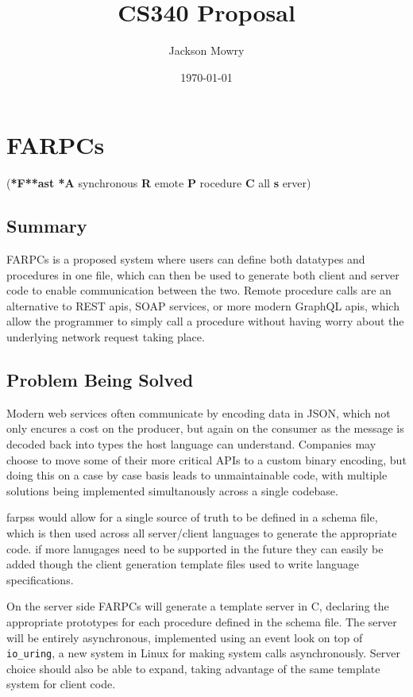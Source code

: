 \documentclass[11pt]{article}
\author{Jackson Mowry}
\date{\today}
\title{CS340 Proposal}
\begin{document}
\maketitle
\section{FARPCs}
\label{sec:org6c3a815}
(\textbf{*F**ast *A} synchronous \textbf{R} emote \textbf{P} rocedure \textbf{C} all \textbf{s} erver)
\subsection{Summary}
\label{sec:orgca4f4f4}
FARPCs is a proposed system where users can define both datatypes and procedures in one file, which can then be used to generate both client and server code to enable communication between the two. Remote procedure calls are an alternative to REST apis, SOAP services, or more modern GraphQL apis, which allow the programmer to simply call a procedure without having worry about the underlying network request taking place.
\subsection{Problem Being Solved}
\label{sec:orge58d764}
Modern web services often communicate by encoding data in JSON, which not only encures a cost on the producer, but again on the consumer as the message is decoded back into types the host language can understand. Companies may choose to move some of their more critical APIs to a custom binary encoding, but doing this on a case by case basis leads to unmaintainable code, with multiple solutions being implemented simultanously across a single codebase.

farpss would allow for a single source of truth to be defined in a schema file, which is then used across all server/client languages to generate the appropriate code. if more lanugages need to be supported in the future they can easily be added though the client generation template files used to write language specifications.

On the server side FARPCs will generate a template server in C, declaring the appropriate prototypes for each procedure defined in the schema file. The server will be entirely asynchronous, implemented using an event look on top of \texttt{io\_uring}, a new system in Linux for making system calls asynchronously. Server choice should also be able to expand, taking advantage of the same template system for client code.
\end{document}

